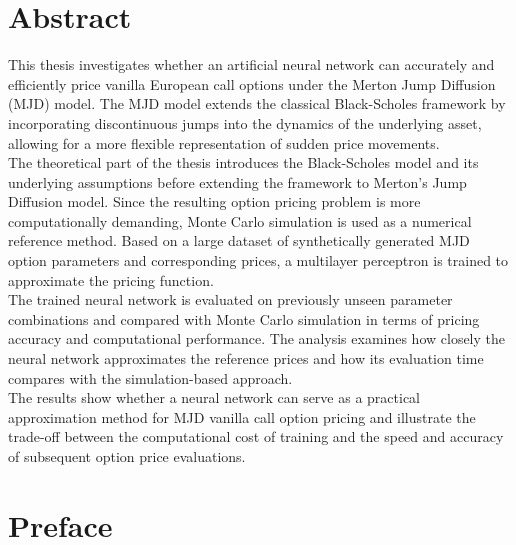 \documentclass{article}
\begin{document}
	
	\section{Abstract}
	
	This thesis investigates whether an artificial neural network can accurately and efficiently price vanilla European call options under the Merton Jump Diffusion (MJD) model. The MJD model extends the classical Black-Scholes framework by incorporating discontinuous jumps into the dynamics of the underlying asset, allowing for a more flexible representation of sudden price movements.\\The theoretical part of the thesis introduces the Black-Scholes model and its underlying assumptions before extending the framework to Merton's Jump Diffusion model. Since the resulting option pricing problem is more computationally demanding, Monte Carlo simulation is used as a numerical reference method. Based on a large dataset of synthetically generated MJD option parameters and corresponding prices, a multilayer perceptron is trained to approximate the pricing function.\\The trained neural network is evaluated on previously unseen parameter combinations and compared with Monte Carlo simulation in terms of pricing accuracy and computational performance. The analysis examines how closely the neural network approximates the reference prices and how its evaluation time compares with the simulation-based approach.\\The results show whether a neural network can serve as a practical approximation method for MJD vanilla call option pricing and illustrate the trade-off between the computational cost of training and the speed and accuracy of subsequent option price evaluations.\\
	
	\section{Preface}
	
\end{document}
